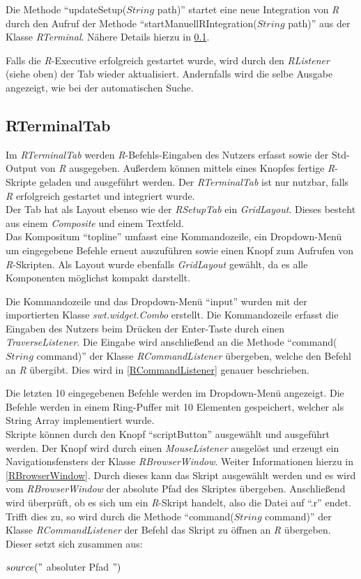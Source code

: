 \documentclass[a4paper, 12pt]{report} %
\begin{document}
Die Methode "`updateSetup($String$ path)"' startet eine neue Integration von \textit{R} durch den Aufruf der Methode "`startManuellRIntegration($String$ path)"' aus der Klasse \textit{RTerminal}. Nähere Details hierzu in \ref{RTerminal}. 

Falls die \textit{R}-Executive erfolgreich gestartet wurde, wird durch den \textit{RListener} (siehe oben) der Tab wieder aktualisiert. Andernfalls wird die selbe Ausgabe angezeigt, wie bei der automatischen Suche.

\subsection{RTerminalTab} \label{RTerminal}

Im \textit{RTerminalTab} werden \textit{R}-Befehls-Eingaben des Nutzers erfasst sowie der Std-Output von \textit{R} ausgegeben. Außerdem können mittels eines Knopfes fertige \textit{R}-Skripte geladen und ausgeführt werden. Der \textit{RTerminalTab} ist nur nutzbar, falls \textit{R} erfolgreich gestartet und integriert wurde.\\

Der Tab hat als Layout ebenso wie der \textit{RSetupTab} ein \textit{GridLayout}.
Dieses besteht aus einem \textit{Composite} und einem Textfeld.\\

Das Kompositum "`topline"' umfasst eine Kommandozeile, ein Dropdown-Menü um eingegebene Befehle erneut auszuführen sowie einen Knopf zum Aufrufen von \textit{R}-Skripten. Als Layout wurde ebenfalls \textit{GridLayout} gewählt, da es alle Komponenten möglichst kompakt darstellt.

Die Kommandozeile und das Dropdown-Menü "`input"' wurden mit der importierten Klasse \textit{swt.widget.Combo} erstellt. Die Kommandozeile erfasst die Eingaben des Nutzers beim Drücken der Enter-Taste durch einen \textit{TraverseListener}. Die Eingabe wird anschließend an die Methode "`command($String$ command)"' der Klasse  \textit{RCommandListener} übergeben, welche den Befehl an \textit{R} übergibt. Dies wird in \ref{RCommandListener} genauer beschrieben.

Die letzten 10 eingegebenen Befehle werden im Dropdown-Menü angezeigt. Die Befehle werden in einem Ring-Puffer mit 10 Elementen gespeichert, welcher als String Array implementiert wurde.\\

Skripte können durch den Knopf "`scriptButton"' ausgewählt und ausgeführt werden. Der Knopf wird durch einen \textit{MouseListener} ausgelöst und erzeugt ein Navigationsfensters der Klasse \textit{RBrowserWindow}. Weiter Informationen hierzu in \ref{RBrowserWindow}. Durch dieses kann das Skript ausgewählt werden und es wird vom \textit{RBrowserWindow} der absolute Pfad des Skriptes übergeben. Anschließend wird überprüft, ob es sich um ein \textit{R}-Skript handelt, also die Datei auf "`.r"' endet. Trifft dies zu, so wird durch die Methode "`command($String$ command)"' der Klasse  \textit{RCommandListener} der Befehl das Skript zu öffnen an \textit{R} übergeben. Dieser setzt sich zusammen aus:
\begin{center}
$source("$  absoluter Pfad $")$
\end{center}
\end{document}
